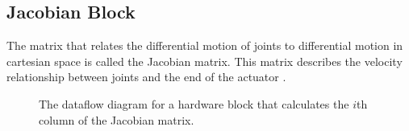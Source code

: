 \subsection{Jacobian Block}

The matrix that relates the differential motion of joints to differential motion in cartesian space is called the Jacobian matrix. This matrix describes the velocity relationship between joints and the end of the actuator \cite{jacobian}.

\begin{figure}[ht]
\center
{}
\caption{The dataflow diagram for a hardware block that calculates the $i$th column of the Jacobian matrix.}
\label{fig:jacobian}
\end{figure}
